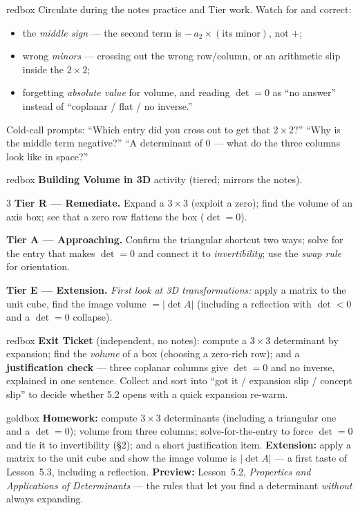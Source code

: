 \documentclass[10pt]{article}
\begin{document}
\begin{skillbox}{redbox}
Circulate during the notes practice and Tier work. Watch for and correct:
\begin{itemize}[leftmargin=1.2em, nosep]
  \item the \emph{middle sign} --- the second term is $\mathbf{-}\,a_2\times(\text{its minor})$, not $+$;
  \item wrong \emph{minors} --- crossing out the wrong row/column, or an arithmetic slip inside the $2\times2$;
  \item forgetting \emph{absolute value} for volume, and reading $\det=0$ as ``no answer'' instead of ``coplanar / flat / no inverse.''
\end{itemize}
Cold-call prompts: ``Which entry did you cross out to get that $2\times2$?'' ``Why is the middle term
negative?'' ``A determinant of $0$ --- what do the three columns look like in space?''
\end{skillbox}

\begin{skillbox}{redbox}
\textbf{Building Volume in 3D} activity (tiered; mirrors the notes).
\begin{multicols}{3}
\textbf{Tier R --- Remediate.} Expand a $3\times3$ (exploit a zero); find the volume of an axis box;
see that a zero row flattens the box ($\det=0$).

\columnbreak
\textbf{Tier A --- Approaching.} Confirm the triangular shortcut two ways; solve for the entry that
makes $\det=0$ and connect it to \emph{invertibility}; use the \emph{swap rule} for orientation.

\columnbreak
\textbf{Tier E --- Extension.} \emph{First look at 3D transformations:} apply a matrix to the unit
cube, find the image volume $=|\det A|$ (including a reflection with $\det<0$ and a $\det=0$ collapse).
\end{multicols}
\end{skillbox}

\begin{skillbox}{redbox}
\textbf{Exit Ticket} (independent, no notes): compute a $3\times3$ determinant by expansion; find the
\emph{volume} of a box (choosing a zero-rich row); and a \textbf{justification check} --- three
coplanar columns give $\det=0$ and no inverse, explained in one sentence. Collect and sort into ``got
it / expansion slip / concept slip'' to decide whether 5.2 opens with a quick expansion re-warm.
\end{skillbox}

\begin{skillbox}{goldbox}
\textbf{Homework:} compute $3\times3$ determinants (including a triangular one and a $\det=0$); volume
from three columns; solve-for-the-entry to force $\det=0$ and tie it to invertibility (§2); and a short
justification item. \textbf{Extension:} apply a matrix to the unit cube and show the image volume is
$|\det A|$ --- a first taste of Lesson~5.3, including a reflection. \textbf{Preview:} Lesson~5.2,
\emph{Properties and Applications of Determinants} --- the rules that let you find a determinant
\emph{without} always expanding.
\end{skillbox}
\end{document}
